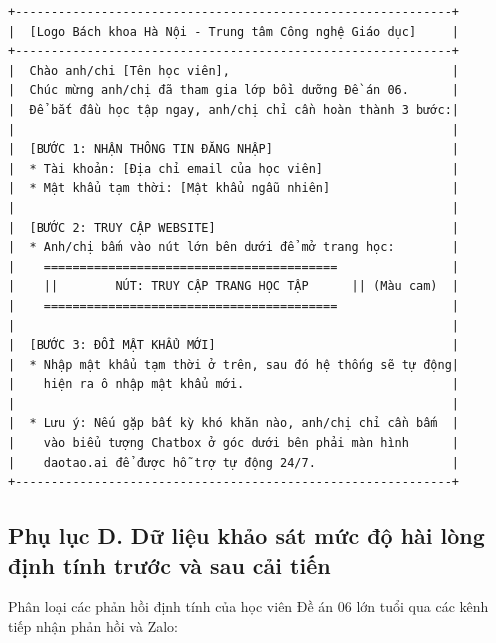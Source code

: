 \begingroup
\fontsize{10}{12}\selectfont
\begin{verbatim}
+-------------------------------------------------------------+
|  [Logo Bách khoa Hà Nội - Trung tâm Công nghệ Giáo dục]     |
+-------------------------------------------------------------+
|  Chào anh/chi [Tên học viên],                               |
|  Chúc mừng anh/chị đã tham gia lớp bồi dưỡng Đề án 06.      |
|  Để bắt đầu học tập ngay, anh/chị chỉ cần hoàn thành 3 bước:|
|                                                             |
|  [BƯỚC 1: NHẬN THÔNG TIN ĐĂNG NHẬP]                         |
|  * Tài khoản: [Địa chỉ email của học viên]                  |
|  * Mật khẩu tạm thời: [Mật khẩu ngẫu nhiên]                 |
|                                                             |
|  [BƯỚC 2: TRUY CẬP WEBSITE]                                 |
|  * Anh/chị bấm vào nút lớn bên dưới để mở trang học:        |
|    =========================================                |
|    ||        NÚT: TRUY CẬP TRANG HỌC TẬP      || (Màu cam)  |
|    =========================================                |
|                                                             |
|  [BƯỚC 3: ĐỔI MẬT KHẨU MỚI]                                 |
|  * Nhập mật khẩu tạm thời ở trên, sau đó hệ thống sẽ tự động|
|    hiện ra ô nhập mật khẩu mới.                             |
|                                                             |
|  * Lưu ý: Nếu gặp bất kỳ khó khăn nào, anh/chị chỉ cần bấm  |
|    vào biểu tượng Chatbox ở góc dưới bên phải màn hình      |
|    daotao.ai để được hỗ trợ tự động 24/7.                   |
+-------------------------------------------------------------+
\end{verbatim}
\endgroup

\subsection*{Phụ lục D. Dữ liệu khảo sát mức độ hài lòng định tính trước và sau cải tiến}

Phân loại các phản hồi định tính của học viên Đề án 06 lớn tuổi qua các kênh tiếp nhận phản hồi và Zalo:

